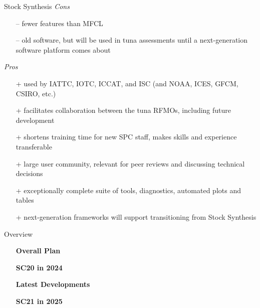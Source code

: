 \documentclass[aspectratio=169,fleqn]{beamer}
\begin{document}
\begin{frame}{Stock Synthesis}
  \textit{\blue Cons}
  \begin{itemize}
    \item[--] fewer features than MFCL\\[1ex]
    \item[--] old software, but will be used in tuna assessments until a
    next-generation\\
    software platform comes about\\[1.5ex]
  \end{itemize}
  \textit{\blue Pros}
  \begin{itemize}
    \item[+] used by IATTC, IOTC, ICCAT, and ISC (and NOAA, ICES, GFCM,
    CSIRO, etc.)\\[1ex]
    \item[+] facilitates collaboration between the tuna RFMOs, including future
    development\\[1ex]
    \item[+] shortens training time for new SPC staff, makes skills and
    experience transferable\\[1ex]
    \item[+] large user community, relevant for peer reviews and discussing
    technical decisions\\[1ex]
    \item[+] exceptionally complete suite of tools, diagnostics, automated plots
    and tables\\[1ex]
    \item[+] next-generation frameworks will support transitioning from Stock
    Synthesis\\[1ex]
  \end{itemize}
\end{frame}


\begin{frame}{Overview}
  \begin{itemize}
    \item[] {\bf\darkblue Overall Plan} \\[5ex]
    \item[] {\bf\darkblue SC20 in 2024} \\[5ex]
    \item[] {\bf\darkblue Latest Developments} \\[5ex]
    \item[] {\bf\darkblue SC21 in 2025} \\[1ex]
  \end{itemize}
\end{frame}
\end{document}
